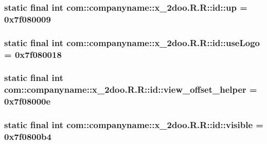 \hypertarget{classcom_1_1companyname_1_1x__2doo_1_1_r_1_1id_a55ce7d86b2f8b40be2b18b1c2a74fcb}{
\subsubsection[{up}]{\setlength{\rightskip}{0pt plus 5cm}static final int com::companyname::x\_\-2doo.R.R::id::up = 0x7f080009}}
\label{classcom_1_1companyname_1_1x__2doo_1_1_r_1_1id_a55ce7d86b2f8b40be2b18b1c2a74fcb}


\hypertarget{classcom_1_1companyname_1_1x__2doo_1_1_r_1_1id_2f977bad71f9f47ffc5bd24ed2e8cf82}{
\subsubsection[{useLogo}]{\setlength{\rightskip}{0pt plus 5cm}static final int com::companyname::x\_\-2doo.R.R::id::useLogo = 0x7f080018}}
\label{classcom_1_1companyname_1_1x__2doo_1_1_r_1_1id_2f977bad71f9f47ffc5bd24ed2e8cf82}


\hypertarget{classcom_1_1companyname_1_1x__2doo_1_1_r_1_1id_7f9b53adfe6fac37ce4d3feeab374e2e}{
\subsubsection[{view\_\-offset\_\-helper}]{\setlength{\rightskip}{0pt plus 5cm}static final int com::companyname::x\_\-2doo.R.R::id::view\_\-offset\_\-helper = 0x7f08000e}}
\label{classcom_1_1companyname_1_1x__2doo_1_1_r_1_1id_7f9b53adfe6fac37ce4d3feeab374e2e}


\hypertarget{classcom_1_1companyname_1_1x__2doo_1_1_r_1_1id_e95044c3f720c9424847c39783188512}{
\subsubsection[{visible}]{\setlength{\rightskip}{0pt plus 5cm}static final int com::companyname::x\_\-2doo.R.R::id::visible = 0x7f0800b4}}
\label{classcom_1_1companyname_1_1x__2doo_1_1_r_1_1id_e95044c3f720c9424847c39783188512}


